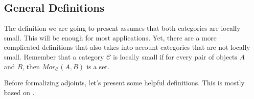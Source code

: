 





\subsection{General Definitions}

The definition we are going to present assumes that both categories are locally small. This will
be enough for most applications. Yet, there are a more complicated definitions that also takes into
account categories that are not locally small. Remember that a category $\mathcal C$
is locally small if for every pair of objects $A$ and $B$, then $Mor_\mathcal C (A,B)$ is a set.

Before formalizing adjoints, let's present some helpful definitions. This is mostly based
on \citet{borceux1994handbook}.


